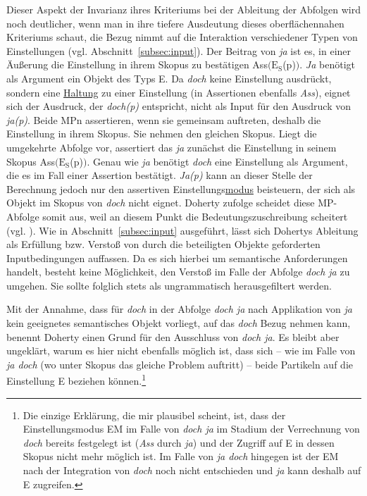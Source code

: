 Dieser Aspekt der Invarianz ihres Kriteriums bei der Ableitung der Abfolgen wird noch deutlicher, wenn man in ihre tiefere Ausdeutung dieses oberflächennahen Kriteriums schaut, die Bezug nimmt auf die Interaktion verschiedener Typen von Einstellungen (vgl. Abschnitt~\ref{subsec:input}). Der Beitrag von \textit{ja} ist es, in einer Äußerung die Einstellung in ihrem Skopus zu bestätigen Ass$(\textrm{E}_{\textrm{S}}$(\textrm{p})$)$. \textit{Ja} benötigt als Argument ein Objekt des Typs E. Da \textit{doch} keine Einstellung ausdrückt, sondern eine \underline{Haltung} zu einer Einstellung (in Assertionen ebenfalls \textit{Ass}), eignet sich der Ausdruck, der \textit{doch(p)} entspricht, nicht als Input für den Ausdruck von \textit{ja(p)}. Beide MPn assertieren, wenn sie gemeinsam auftreten, deshalb die Einstellung in ihrem Skopus. Sie nehmen den gleichen Skopus. Liegt die umgekehrte Abfolge vor, assertiert das \textit{ja} zunächst die Einstellung in seinem Skopus Ass$(\textrm{E}_{\textrm{S}}$(\textrm{p})$)$. Genau wie \textit{ja} benötigt \textit{doch} eine Einstellung als Argument, die es im Fall einer Assertion bestätigt. \textit{Ja(p)} kann an dieser Stelle der Berechnung jedoch nur den assertiven Einstellungs\underline{modus} beisteuern, der sich als Objekt im Skopus  von \textit{doch} nicht eignet. Doherty zufolge scheidet diese MP-Abfolge somit aus, weil an diesem Punkt die Bedeutungszuschreibung scheitert (vgl. \citealt[84-85]{Doherty1985}). Wie in Abschnitt~\ref{subsec:input} ausgeführt, lässt sich Dohertys Ableitung als Erfüllung bzw. Verstoß von durch die beteiligten Objekte geforderten Inputbedingungen auffassen. Da es sich hierbei um semantische Anforderungen handelt, besteht keine Möglichkeit, den Verstoß im Falle der Abfolge \textit{doch ja} zu umgehen. Sie sollte folglich stets als ungrammatisch herausgefiltert werden.

Mit der Annahme, dass für \textit{doch} in der Abfolge \textit{doch ja} nach Applikation von \textit{ja} kein geeignetes semantisches Objekt vorliegt, auf das \textit{doch} Bezug nehmen kann, benennt Doherty einen Grund für den Ausschluss von \textit{doch ja}. Es bleibt aber ungeklärt, warum es hier nicht ebenfalls möglich ist, dass sich – wie im Falle von \textit{ja doch} (wo unter Skopus das gleiche Problem auftritt) – beide Partikeln auf die Einstellung E beziehen können.\footnote{Die einzige Erklärung, die mir plausibel scheint, ist, dass der Einstellungsmodus EM im Falle von \textit{doch ja} im Stadium der Verrechnung von \textit{doch} bereits festgelegt ist (\textit{Ass} durch \textit{ja}) und der Zugriff auf E in dessen Skopus nicht mehr möglich ist. Im Falle von \textit{ja doch} hingegen ist der EM nach der Integration von \textit{doch} noch nicht entschieden und \textit{ja} kann deshalb auf E zugreifen.}

